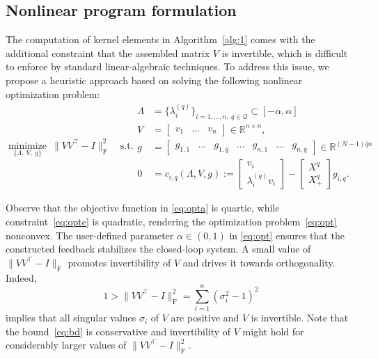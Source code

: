 \documentclass[11pt]{article}
\theoremstyle{plain}
\theoremstyle{definition}
\theoremstyle{remark}
\begin{document}
\subsection{Nonlinear program formulation}
The computation of kernel elements in Algorithm~\ref{alg:1} comes with the additional constraint that the assembled matrix $V$ is invertible, which is difficult to enforce by standard linear-algebraic techniques. To address this issue, we propose a heuristic approach based on solving the following nonlinear optimization problem:
\begin{subequations}
\label{eq:opt}
    \begin{equation}
        \label{eq:opta}
        \operatorname*{minimize}_{\{\Lambda,\ V,\ g\}}\ \lVert VV^\top -I\rVert_\mathrm{F}^2\quad \text{s.t.}
    \end{equation}
    \begin{align}
        \label{eq:optb}
        \Lambda &= \{\lambda_i^{(q)}\}_{i=1,\dots, n,\ q\in\mathcal Q} \subset [-\alpha, \alpha]\\
        V &= \begin{bmatrix}
            v_1 & \dots & v_n
        \end{bmatrix}\in\mathbb R^{n\times n},\\
        g &= \begin{bmatrix}
            g_{1,1} &\!\!\dots\!\!& g_{1,\bar q} &\!\! \dots\!\! & g_{n,1} &\! \!\dots\!\! & g_{n,\bar q}
        \end{bmatrix}\in\mathbb R^{(N-1)\bar q n}\\
        \label{eq:opte}
        0&=c_{i,q}(\Lambda,V,g):=\begin{bmatrix}
            v_i\\
            \lambda_i^{(q)} v_i
        \end{bmatrix} - \begin{bmatrix}
            X^q\\
            X_+^q
        \end{bmatrix}g_{i,q}.
    \end{align}
\end{subequations}

Observe that the objective function in \eqref{eq:opta} is quartic, while constraint~\eqref{eq:opte} is quadratic, rendering the optimization problem~\eqref{eq:opt} nonconvex. The user-defined parameter $\alpha\in(0,1)$ in \eqref{eq:opt} ensures that the constructed feedback stabilizes the closed-loop system. A small value of $\lVert VV^\top -I\rVert_\mathrm{F}$ promotes invertibility of $V$ and drives it towards orthogonality. Indeed,
\begin{equation}
\label{eq:bd}
    1>\lVert VV^\top -I\rVert_\mathrm{F}^2 = \sum_{i=1}^n (\sigma_i^2 - 1)^2
\end{equation} implies that all singular values $\sigma_i$ of $V$ are positive and $V$ is invertible. Note that the bound~\eqref{eq:bd} is conservative and invertibility of $V$ might hold for considerably larger values of $\lVert VV^\top -I\rVert_\mathrm{F}^2$.
\end{document}
